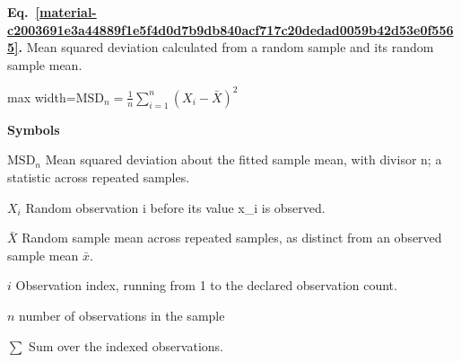 \documentclass[11pt,a4paper]{article}
\begin{document}
\par\medskip
\noindent\begin{minipage}{\linewidth}
\label{material-c2003691e3a44889f1e5f4d0d7b9db840acf717c20dedad0059b42d53e0f5565}
\noindent\textbf{Eq.~\ref*{material-c2003691e3a44889f1e5f4d0d7b9db840acf717c20dedad0059b42d53e0f5565}.} Mean squared deviation calculated from a random sample and its random sample mean.\par\nopagebreak
\begin{center}\begin{adjustbox}{max width=\linewidth}$\displaystyle \mathrm{MSD}_n=\frac1n{\textstyle\sum_{i=1}^n}(X_i-\bar X)^2$\end{adjustbox}\end{center}

\par\noindent\textbf{Symbols}

\par\noindent\textbf{\(\mathrm{MSD}_n\)} Mean squared deviation about the fitted sample mean, with divisor n; a statistic across repeated samples.

\par\noindent\textbf{\(X_i\)} Random observation i before its value x\_i is observed.

\par\noindent\textbf{\(\bar X\)} Random sample mean across repeated samples, as distinct from an observed sample mean \ensuremath{\bar{x}}.

\par\noindent\textbf{\(i\)} Observation index, running from 1 to the declared observation count.

\par\noindent\textbf{\(n\)} number of observations in the sample

\par\noindent\textbf{\(\sum\)} Sum over the indexed observations.

\end{minipage}\par
\medskip
\end{document}
